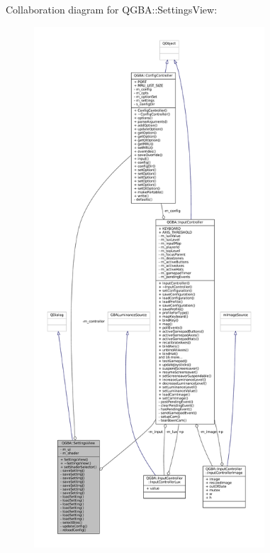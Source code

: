 Collaboration diagram for Q\+G\+BA\+:\+:Settings\+View\+:
\nopagebreak
\begin{figure}[H]
\begin{center}
\leavevmode
\includegraphics[height=550pt]{class_q_g_b_a_1_1_settings_view__coll__graph}
\end{center}
\end{figure}
